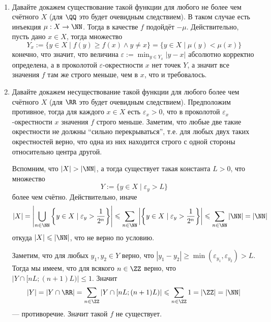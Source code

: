 \documentclass[12pt,a4paper]{article}
\begin{document}
    \begin{enumproblem}\ 
        \ItemedProblem
        \begin{enumerate}
            \item Давайте докажем существование такой функции для любого не более чем счётного $X$ (для $\QQ$ это будет очевидным следствием). В таком случае есть инъекция $\mu: X \to \NN$. Тогда в качестве $f$ подойдёт $-\mu$. Действительно, пусть дано $x \in X$, тогда множество
                \[Y_x := \{y \in X \mid f(y) \geqslant f(x) \wedge y \neq x\} = \{y \in X \mid \mu(y) < \mu(x)\}\]
                конечно, что значит, что величина $\varepsilon := \min_{y \in Y_x} |y-x|$ абсолютно корректно определена, а в проколотой $\varepsilon$-окрестности $x$ нет точек $Y$, а значит все значения $f$ там же строго меньше, чем в $x$, что и требовалось.
            \item Давайте докажем несуществование такой функции для любого более чем счётного $X$ (для $\RR$ это будет очевидным следствием). Предположим противное, тогда для каждого $x \in X$ есть $\varepsilon_x > 0$, что в проколотой $\varepsilon_x$-окрестности $x$ значения $f$ строго меньше. Заметим, что любые две такие окрестности не должны ``сильно перекрываться'', т.е. для любых двух таких окрестностей верно, что одна из них находится строго с одной стороны относительно центра другой.

                Вспомним, что $|X| > |\NN|$, а тогда существует такая константа $L > 0$, что множество
                \[Y := \{y \in X \mid \varepsilon_y > L\}\]
                более чем счётно. Действительно, иначе
                \[|X| = \left|\bigcup_{n \in \NN} \left\{y \in X \mid \varepsilon_y > \frac{1}{2^n}\right\}\right| \leqslant \sum_{n \in \NN} \left|\left\{y \in X \mid \varepsilon_y > \frac{1}{2^n}\right\}\right| \leqslant \sum_{n \in \NN} |\NN| = |\NN|\]
                откуда $|X| \leqslant |\NN|$, что не верно по условию.

                Заметим, что для любых $y_1, y_2 \in Y$ верно, что $|y_1 - y_2| \geqslant \min(\varepsilon_{y_1}, \varepsilon_{y_2}) > L$. Тогда мы имеем, что для всякого $n \in \ZZ$ верно, что $|Y \cap [nL; (n+1)L)| \leqslant 1$. Значит
                \[|Y| = |Y \cap \RR| = \sum_{n \in \ZZ} |Y \cap [nL; (n+1)L)| \leqslant \sum_{n \in \ZZ} 1 = |\ZZ| = |\NN|\]
                --- противоречие. Значит такой $f$ не существует.
        \end{enumerate}
    \end{enumproblem}
\end{document}
